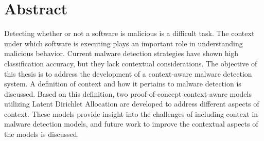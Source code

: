 \documentclass[../stegner_thesis.tex]{subfiles}
\begin{document}
\chapter*{Abstract}%
\label{ch:abstract}

\par Detecting whether or not a software is malicious is a difficult task.
The context under which software is executing plays an important role in
understanding malicious behavior.
Current malware detection strategies have shown high classification accuracy,
but they lack contextual considerations.
The objective of this thesis is to address the development of a context-aware
malware detection system.
A definition of context and how it pertains to malware detection is discussed.
Based on this definition, two proof-of-concept context-aware models utilizing
Latent Dirichlet Allocation are developed to address different aspects of
context.
These models provide insight into the challenges of including context in
malware detection models, and future work to improve the contextual aspects
of the models is discussed.

\newpage
\end{document}
